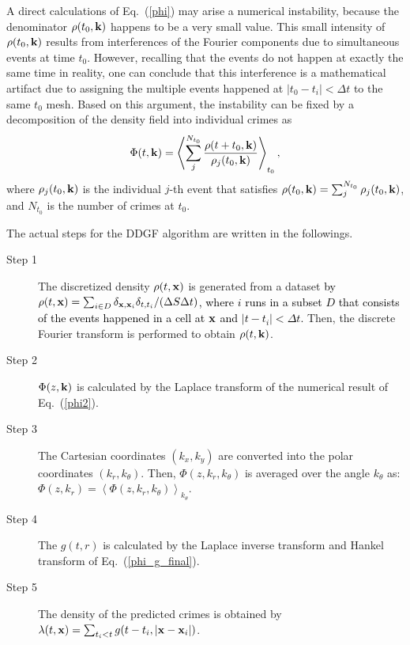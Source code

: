 \documentclass[review]{elsarticle}
\newcommand{\red}[1]{\textcolor{black}{#1}}
\newcommand{\bra}{\left\langle}
\newcommand{\ket}{\right\rangle}
\newcommand{\bv}[1]{{\bf #1}}
\begin{document}
A direct calculations of Eq.~(\ref{phi}) may arise
a numerical instability, because the denominator $\rho(t_0,\bv{k})$
happens to be a very small value.
This small intensity of $\rho(t_0,\bv{k})$ results from
interferences of the Fourier components
due to simultaneous events at time $t_0$.
However, recalling that the events do not happen at exactly the same time in reality,
one can conclude that this interference is a mathematical artifact
due to assigning the multiple events happened at $|t_0-t_i|<\Delta t$
to the same $t_0$ mesh.
Based on this argument,
the instability can be fixed by a decomposition of the density field into individual crimes as
\begin{eqnarray}
\Phi(t,\bv{k})
= \bra \sum_j^{N_{t_0}} \frac{ \rho(t+t_0,\bv{k}) }{\rho_j(t_0,\bv{k}) } \ket_{t_0},
 \label{phi2}
\end{eqnarray}
 where $\rho_j(t_0, \bv{k})$ is the individual $j$-th event that satisfies
$\rho(t_0, \bv{k})=\sum_j^{N_{t_0}}\rho_j(t_0, \bv{k})$, and
$N_{t_0}$ is the number of crimes at $t_0$.


The actual steps for the DDGF algorithm are written in the followings.
\begin{description}
%
\item[Step 1] The discretized density $\rho(t,\bv{x})$ is generated from a dataset
\red{ 
by 
 $\rho(t,\bv{x}) = \sum_{i\in D} \delta_{\bv{x},\bv{x}_i} \delta_{t, t_i}/ (\Delta  S \Delta t) $,
 where $i$ runs in a subset $D$ that consists of the events happened in a cell at $\bv{x}$ and $|t-t_i|<\Delta t$.
 }
Then, the discrete Fourier transform is performed to obtain $\rho(t,\bv{k})$.
%
\item[Step 2]
$\Phi(z,\bv{k})$ is calculated by the Laplace transform of
the numerical result of 
Eq.~(\ref{phi2}).
%
\item[Step 3]
The Cartesian coordinates $(k_x, k_y)$  are converted
into the polar coordinates $(k_r,k_\theta)$.
Then, $\Phi(z,k_r,k_\theta)$ is averaged over the angle $k_\theta$ as: $\Phi(z,k_r) = \bra \Phi(z,k_r,k_\theta)\ket_{k_\theta}$.
%
\item[Step 4]
The  $g(t,r)$ is calculated by
 the Laplace inverse transform \red{\cite{laplace}} and Hankel transform
 of   Eq.~(\ref{phi_g_final}).
%
\item[Step 5] The density of the predicted crimes is obtained by $\lambda(t,\bv{x}) = \sum_{t_i<t} g(t-t_i,|\bv{x}-\bv{x}_i| )$.
\end{description}
\end{document}
